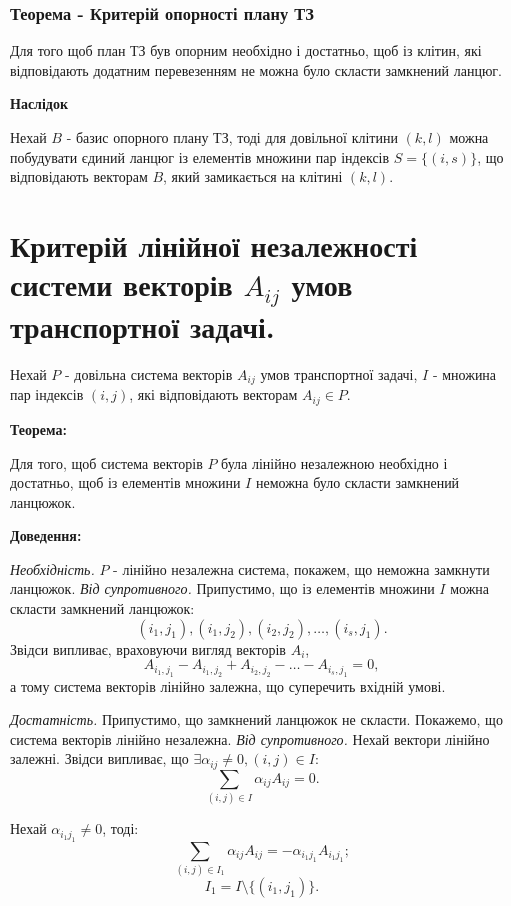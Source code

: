 \documentclass[12pt,a4paper]{report}
\begin{document}
\subsection{Теорема - Критерій опорності плану ТЗ}

Для того щоб план ТЗ був опорним необхідно і достатньо, щоб із клітин, які відповідають додатним перевезенням не можна було скласти замкнений ланцюг.

{\bf Наслідок}

Нехай $B$ - базис опорного плану ТЗ, тоді для довільної клітини $(k,l)$ можна побудувати єдиний ланцюг із елементів множини пар індексів $S=\{(i,s)\}$, що відповідають векторам $B$, який замикається на клітині $(k,l)$.

\clearpage

\chapter{Критерій лінійної незалежності системи векторів $A_{ij}$ умов транспортної задачі.}

Нехай $P$ - довільна система векторів $A_{ij}$ умов транспортної задачі, $I$ - множина пар індексів $(i,j)$, які відповідають векторам $A_{ij} \in P$.

{\bf Теорема:}

Для того, щоб система векторів $P$ була лінійно незалежною необхідно і достатньо, щоб із елементів множини $I$ неможна було скласти замкнений ланцюжок.

{\bf Доведення:}

{\it Необхідність.} $P$ - лінійно незалежна система, покажем, що неможна замкнути ланцюжок. {\it Від супротивного.} Припустимо, що із елементів множини $I$ можна скласти замкнений ланцюжок: 
\[ (i_1,j_1), (i_1,j_2), (i_2,j_2), \dots, (i_s,j_1). \]
Звідси випливає, враховуючи вигляд векторів $A_i$, 
\[ A_{{i_1},{j_1}}-A_{{i_1},{j_2}}+A_{{i_2},{j_2}}-\dots-A_{{i_s},{j_1}}=0,\]
а тому система векторів лінійно залежна, що суперечить вхідній умові.

{\it Достатність.} Припустимо, що замкнений ланцюжок не скласти. Покажемо, що система векторів лінійно незалежна. {\it Від супротивного.} Нехай вектори лінійно залежні. Звідси випливає, що $\exists \alpha_{ij} \neq 0, (i,j) \in I:$ 
\[ \sum_{(i,j) \in I}\alpha_{ij}A_{ij} = 0. \]

Нехай $\alpha_{{i_1}{j_1}} \neq 0$, тоді: 
\[ \sum_{(i,j) \in I_1}\alpha_{ij}A_{ij} = -\alpha_{{i_1}{j_1}}A_{{i_1}{j_1}}; \]
\[ I_1 = I\setminus\{(i_1,j_1)\}. \]
\end{document}
